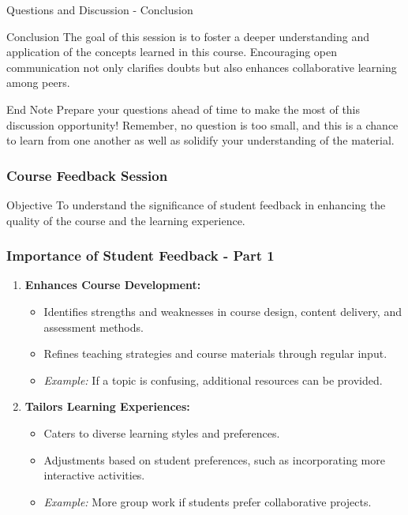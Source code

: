 \documentclass[aspectratio=169]{beamer}
\begin{document}
\begin{frame}[fragile]{Questions and Discussion - Conclusion}
    \begin{block}{Conclusion}
    The goal of this session is to foster a deeper understanding and application of the concepts learned in this course. Encouraging open communication not only clarifies doubts but also enhances collaborative learning among peers.
    \end{block}
    
    \begin{block}{End Note}
    Prepare your questions ahead of time to make the most of this discussion opportunity! Remember, no question is too small, and this is a chance to learn from one another as well as solidify your understanding of the material.
    \end{block}
\end{frame}

\begin{frame}[fragile]
    \frametitle{Course Feedback Session}
    \begin{block}{Objective}
        To understand the significance of student feedback in enhancing the quality of the course and the learning experience.
    \end{block}
\end{frame}

\begin{frame}[fragile]
    \frametitle{Importance of Student Feedback - Part 1}
    \begin{enumerate}
        \item \textbf{Enhances Course Development:}
            \begin{itemize}
                \item Identifies strengths and weaknesses in course design, content delivery, and assessment methods.
                \item Refines teaching strategies and course materials through regular input.
                \item \textit{Example:} If a topic is confusing, additional resources can be provided.
            \end{itemize}
        \item \textbf{Tailors Learning Experiences:}
            \begin{itemize}
                \item Caters to diverse learning styles and preferences.
                \item Adjustments based on student preferences, such as incorporating more interactive activities.
                \item \textit{Example:} More group work if students prefer collaborative projects.
            \end{itemize}
    \end{enumerate}
\end{frame}
\end{document}
